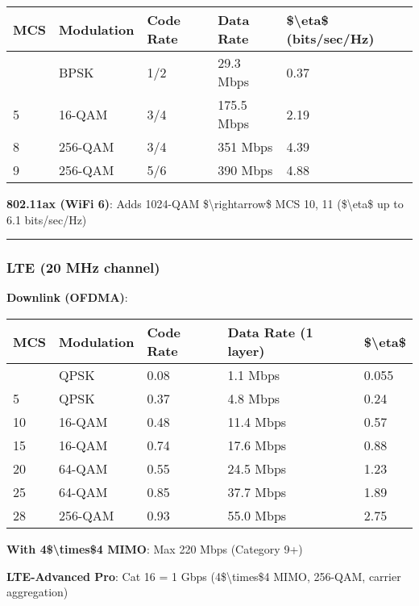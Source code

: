 {\def\LTcaptype{} %
\begin{longtable}[]{@{}lllll@{}}
\toprule\noalign{}
MCS & Modulation & Code Rate & Data Rate & \$\textbackslash eta\$
(bits/sec/Hz) \\
\midrule\noalign{}
\endhead
\bottomrule\noalign{}
\endlastfoot
0 & BPSK & 1/2 & 29.3 Mbps & 0.37 \\
5 & 16-QAM & 3/4 & 175.5 Mbps & 2.19 \\
8 & 256-QAM & 3/4 & 351 Mbps & 4.39 \\
9 & 256-QAM & 5/6 & 390 Mbps & 4.88 \\
\end{longtable}
}

\textbf{802.11ax (WiFi 6)}: Adds 1024-QAM \$\textbackslash rightarrow\$
MCS 10, 11 (\$\textbackslash eta\$ up to 6.1 bits/sec/Hz)

\begin{center}\rule{0.5\linewidth}{0.5pt}\end{center}

\subsubsection{LTE (20 MHz channel)}\label{lte-20-mhz-channel}

\textbf{Downlink (OFDMA)}:

{\def\LTcaptype{} %
\begin{longtable}[]{@{}lllll@{}}
\toprule\noalign{}
MCS & Modulation & Code Rate & Data Rate (1 layer) &
\$\textbackslash eta\$ \\
\midrule\noalign{}
\endhead
\bottomrule\noalign{}
\endlastfoot
0 & QPSK & 0.08 & 1.1 Mbps & 0.055 \\
5 & QPSK & 0.37 & 4.8 Mbps & 0.24 \\
10 & 16-QAM & 0.48 & 11.4 Mbps & 0.57 \\
15 & 16-QAM & 0.74 & 17.6 Mbps & 0.88 \\
20 & 64-QAM & 0.55 & 24.5 Mbps & 1.23 \\
25 & 64-QAM & 0.85 & 37.7 Mbps & 1.89 \\
28 & 256-QAM & 0.93 & 55.0 Mbps & 2.75 \\
\end{longtable}
}

\textbf{With 4\$\textbackslash times\$4 MIMO}: Max 220 Mbps (Category
9+)

\textbf{LTE-Advanced Pro}: Cat 16 = 1 Gbps (4\$\textbackslash times\$4
MIMO, 256-QAM, carrier aggregation)

